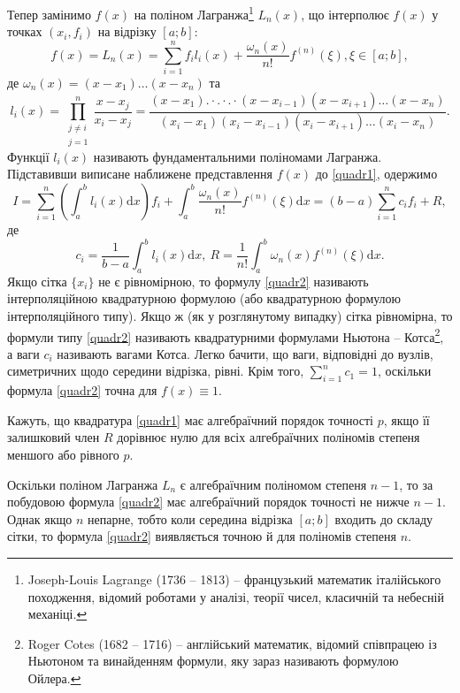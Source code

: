 \documentclass[14pt,twoside]{extreport}
\theoremstyle{mystyle}
\numberwithin{equation}{chapter}
\begin{document}
Тепер замінимо $f(x)$ на поліном Лагранжа\footnote{Joseph-Louis Lagrange (1736 -- 1813) -- французький математик італійського походження, відомий роботами у аналізі, теорії чисел, класичній та небесній механіці.} $L_n(x)$, що інтерполює $f(x)$ у точках $(x_i, f_i)$ на відрізку $[a; b]$:
\[
f(x)=L_{n}(x)=\sum_{i=1}^{n}f_{i}l_{i}(x)+\frac{\omega_{n}(x)}{n!}f^{(n)}(\xi), \xi\in[a; b],
\]
де $\omega_{n}(x)=(x-x_{1})\ldots(x-x_{n})$ та
\[
l_{i}(x) = \displaystyle \prod\limits_{\substack{
	j\neq i\\
	j=1}}^{n}\frac{x-x_{j}}{x_{i}-x_{j}}=\frac{(x-x_{1}).\cdot.\cdot.\cdot(x-x_{i-1})(x-x_{i+1})\ldots(x-x_{n})}{(x_{i}-x_{1})(x_{i}-x_{i-1})(x_{i}-x_{i+1})\ldots(x_{i}-x_{n})}.
\]
Функції $l_i(x)$ називають фундаментальними поліномами Лагранжа. Підставивши виписане наближене представлення $f(x)$ до \eqref{quadr1}, одержимо
\begin{equation}\label{quadr2}
I = \displaystyle \sum_{i=1}^{n}\left(\int_{a}^{b}l_{i}(x)\mathrm{d}x\right)f_{i}+\int_{a}^{b}\frac{\omega_{n}(x)}{n!}f^{(n)}(\xi)\mathrm{d}x= (b-a)\sum_{i=1}^{n}c_{i}f_{i}+R,
\end{equation}
де
\[
c_{i}=\frac{1}{b-a}\int_{a}^{b}l_{i}(x)\mathrm{d}x,\ R=\frac{1}{n!}\int_{a}^{b}\omega_{n}(x)f^{(n)}(\xi)\mathrm{d}x.
\]
Якщо сітка $\{x_i\}$ не є рівномірною, то формулу \eqref{quadr2} називають інтерполяційною квадратурною формулою (або квадратурною формулою інтерполяційного типу). Якщо ж (як у розглянутому випадку) сітка рівномірна, то формули типу \eqref{quadr2} називають квадратурними формулами Ньютона -- Котса\footnote{Roger Cotes (1682 -- 1716) -- англійський математик, відомий співпрацею із Ньютоном та винайденням формули, яку зараз називають формулою Ойлера.}, а ваги $c_i$ називають вагами Котса. Легко бачити, що ваги, відповідні до вузлів, симетричних щодо середини відрізка, рівні. Крім того, $\displaystyle \sum_{i=1}^{n} c_1 = 1$, оскільки формула \eqref{quadr2} точна для $f(x) \equiv 1$.

Кажуть, що квадратура \eqref{quadr1} має алгебраїчний порядок точності $p$, якщо її залишковий член $R$ дорівнює нулю для всіх алгебраїчних поліномів степеня меншого або рівного $p$.

Оскільки поліном Лагранжа $L_n$ є алгебраїчним поліномом степеня $n-1$, то за побудовою формула \eqref{quadr2} має алгебраїчний порядок точності не нижче $n-1$. Однак якщо $n$ непарне, тобто коли середина відрізка $[a; b]$ входить до складу сітки, то формула \eqref{quadr2} виявляється точною й для поліномів степеня $n$.
\end{document}
